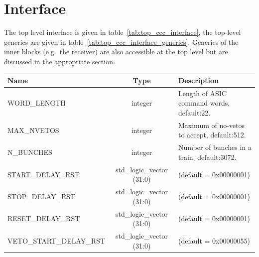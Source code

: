     \section{Interface} %
    \label{sub:top_interface}
    The top level interface is given in table~\ref{tab:top_ccc_interface}, the top-level generics are given in table~\ref{tab:top_ccc_interface_generics}. Generics of the inner blocks (e.g.\ the receiver) are also accessible at the top level but are discussed in the appropriate section. 
    \begin{table}
        \begin{center}
            \begin{tabulary}{\textwidth}{l | c | L}
                Name & Type & Description \\
                \hline
                WORD\_LENGTH               & integer                   & Length of ASIC command words, default:22.    \\
                MAX\_NVETOS                & integer                   & Maximum of no-vetos to accept, default:512.  \\
                N\_BUNCHES                 & integer                   & Number of bunches in a train, default:3072.  \\ 
                START\_DELAY\_RST          & std\_logic\_vector (31:0) & (default = 0x00000001)                \\
                STOP\_DELAY\_RST           & std\_logic\_vector (31:0) & (default = 0x00000001)                \\
                RESET\_DELAY\_RST          & std\_logic\_vector (31:0) & (default = 0x00000001)                \\
                VETO\_START\_DELAY\_RST    & std\_logic\_vector (31:0) & (default = 0x00000055)                \\

\end{tabulary}
\end{center}
\end{table}
